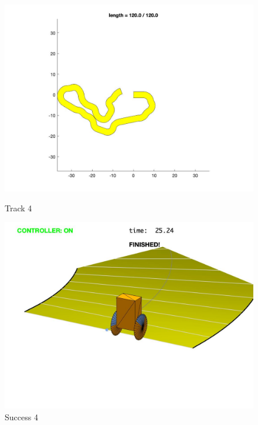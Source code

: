 \documentclass{article}
\begin{document}
\begin{figure}[H]
\centering
\begin{minipage}{.5\textwidth}
	\centering
	\includegraphics[width=.8\linewidth]{track 4.jpg}
	\caption{Track 4}
	\end{minipage}%
\begin{minipage}{.5\textwidth}
	\centering
	\includegraphics[width=.8\linewidth]{track 4r.jpg}
	\caption{Success 4}
\end{minipage}
\end{figure}
\end{document}
